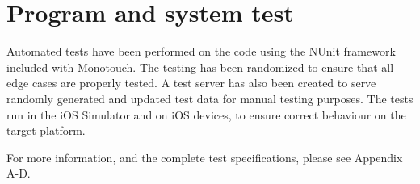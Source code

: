 \section{Program and system test} %
\label{sec:program_and_system_test}

Automated tests have been performed on the code using the NUnit framework included
with Monotouch. The testing has been randomized to ensure that all edge cases are properly
tested. A test server has also been created to serve randomly generated and updated test
data for manual testing purposes. The tests run in the iOS Simulator and on iOS devices,
to ensure correct behaviour on the target platform.

For more information, and the complete test specifications, please see Appendix A-D.


